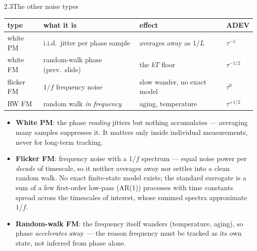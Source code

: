 \documentclass[10pt]{beamer}
\newcommand{\srcline}[1]{\par\vfill\noindent{\tiny\textcolor{gray}{Source: #1}}}
\begin{document}
\begin{frame}{2.3\quad The other noise types}
\small
\begin{center}
\footnotesize
\begin{tabular}{llll}
\toprule
type & what it is & effect & ADEV\\
\midrule
white PM & i.i.d.\ jitter per phase sample & averages away as $1/L$ & $\tau^{-1}$\\
white FM & random-walk phase (prev.\ slide) & the $kT$ floor & $\tau^{-1/2}$\\
flicker FM & $1/f$ frequency noise & slow wander, no exact model & $\tau^{0}$\\
RW FM & random walk \emph{in frequency} & aging, temperature & $\tau^{+1/2}$\\
\bottomrule
\end{tabular}
\end{center}
\begin{itemize}
\item \textbf{White PM}: the phase \emph{reading} jitters but nothing
accumulates --- averaging many samples suppresses it. It matters only
inside individual measurements, never for long-term tracking.
\item \textbf{Flicker FM}: frequency noise with a $1/f$ spectrum ---
equal noise power per \emph{decade} of timescale, so it neither
averages away nor settles into a clean random walk. No exact
finite-state model exists; the standard surrogate is a sum of a few
first-order low-pass (AR(1)) processes with time constants spread
across the timescales of interest, whose summed spectra approximate
$1/f$.
\item \textbf{Random-walk FM}: the frequency itself wanders
(temperature, aging), so phase \emph{accelerates} away --- the reason
frequency must be tracked as its own state, not inferred from phase
alone.
\end{itemize}
\srcline{Taxonomy: IEEE Std 1139.}
\end{frame}
\end{document}
